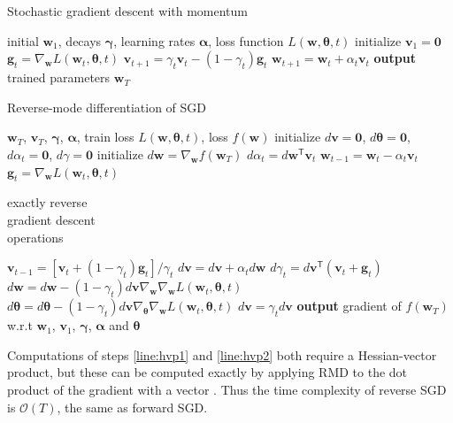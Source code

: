 \documentclass{article}
\newcommand{\vw}{\mathbf{w}}
\newcommand{\vv}{\mathbf{v}}
\newcommand{\vg}{\mathbf{g}}
\newcommand{\vzero}{\mathbf{0}}
\newcommand{\tra}{^{\mathsf{T}}}
\newcommand{\hypers}{{\boldsymbol{\theta}}}
\newcommand{\params}{\vw}
\newcommand{\decay}{\gamma}
\newcommand{\decays}{{\boldsymbol{\decay}}}
\newcommand{\stepsize}{\alpha}
\newcommand{\stepsizes}{{\boldsymbol{\stepsize}}}
\newcommand{\gradparams}{\nabla_\params L(\params_t, \hypers, t)}
\begin{document}
\begin{algorithm}
   \caption{Stochastic gradient descent with momentum}
   \label{alg:sgd}
\begin{algorithmic}[1]
    initial $\params_1$, decays $\decays$, learning rates $\stepsizes$, loss function $L(\params, \hypers, t)$
   \State initialize $\vv_1 = \vzero$
   \State $\vg_t = \gradparams$ 
   \State $\vv_{t+1} = \decay_t \vv_t - (1 - \decay_t) \vg_t$   \label{step:update velocity}
   \State $\params_{t+1} = \params_t + \stepsize_t \vv_t$  \label{step:update position}
   \EndFor
   \State \textbf{output} trained parameters $\params_T$
\end{algorithmic}
\end{algorithm}
%
\begin{algorithm}
   \caption{Reverse-mode differentiation of SGD}
   \label{alg:reverse-sgd}
\begin{algorithmic}[1]
    $\params_T$, $\vv_T$, $\decays$, $\stepsizes$, train loss $L(\params, \hypers, t)$, loss $f(\params)$
   \State initialize $d\vv = \vzero$, $d\hypers = \vzero$, $d\stepsize_t = \vzero$, $d\decay = \vzero$
   \State initialize $d\params = \nabla_\params f(\params_T)$
   \State $d\stepsize_t = d\params\tra \vv_t$
   \State $\params_{t-1} = \params_t - \stepsize_t \vv_t$ \label{step:reverse-position}
   \vspace{-0.95\baselineskip}
   \State $\vg_t = \gradparams$ \label{step:reverse-gradient}
   \hfill \scalebox{1.1}{\Bigg\}} \vspace{-\baselineskip} \begin{minipage}{2.5cm} exactly reverse \\ gradient descent \\ operations \strut \end{minipage}
   \State $\vv_{t-1} = [\vv_t + (1 - \decay_t) \vg_t] / \decay_t$ \label{step:reverse-velocity}
   \State $d\vv = d\vv + \stepsize_t d\params$
   \State $d\decay_t = d\vv\tra (\vv_t + \vg_t)$
   \State $d\params = d\params - (1 - \decay_t) d\vv \nabla_\params \gradparams$ \label{line:hvp1}
   \State $d\hypers = d\hypers - (1 - \decay_t) d\vv \nabla_\hypers \gradparams$ \label{line:hvp2}
   \State $d\vv = \decay_t d\vv$
   \EndFor
   \State \textbf{output} gradient of $f(\params_T)$ w.r.t $\params_1$, $\vv_1$, $\decays$, $\stepsizes$ and $\hypers$
\end{algorithmic}
\end{algorithm}
%
Computations of steps \ref{line:hvp1} and \ref{line:hvp2} both require a
Hessian-vector product, but these can be computed exactly by applying RMD to the
dot product of the gradient with a vector \citep{pearlmutter1994fast}.  Thus the
time complexity of reverse SGD is $\mathcal{O}(T)$, the same as forward SGD.
\end{document}

